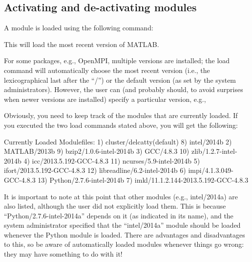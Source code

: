 \subsection{Activating and de-activating modules}

A module is loaded using the following command:

\begin{prompt}
\end{prompt}

This will load the most recent version of MATLAB.

For some packages, e.g., OpenMPI, multiple versions are installed; the load
command will automatically choose the most recent version (i.e., the
lexicographical last after the ``/'') or the default version (as set by the
system administrators). However, the user can (and probably should, to avoid
surprises when newer versions are installed) specify a particular version,
e.g.,

\begin{prompt}
\end{prompt}

Obviously, you need to keep track of the modules that are currently
loaded. If you executed the two load commands stated above, you will get the
following:

\begin{prompt}
Currently Loaded Modulefiles:
  1) cluster/delcatty(default)              8) intel/2014b
  2) MATLAB/2013b                           9) bzip2/1.0.6-intel-2014b
  3) GCC/4.8.3                             10) zlib/1.2.7-intel-2014b
  4) icc/2013.5.192-GCC-4.8.3              11) ncurses/5.9-intel-2014b
  5) ifort/2013.5.192-GCC-4.8.3            12) libreadline/6.2-intel-2014b
  6) impi/4.1.3.049-GCC-4.8.3              13) Python/2.7.6-intel-2014b
  7) imkl/11.1.2.144-2013.5.192-GCC-4.8.3
\end{prompt}

It is important to note at this point that other modules (e.g., intel/2014a)
are also listed, although the user did not explicitly load them. This is
because ``Python/2.7.6-intel-2014a'' depends on it (as indicated in its name),
and the system administrator specified that the ``intel/2014a'' module should
be loaded whenever the Python module is loaded. There are advantages and
disadvantages to this, so be aware of automatically loaded modules whenever
things go wrong: they may have something to do with it!

